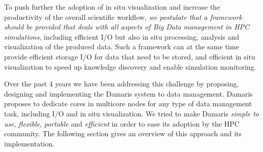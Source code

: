 		To push further the adoption of in situ visualization and increase the productivity of the overall
		scientific workflow, \emph{we postulate that a framework should be provided that deals with
		all aspects of Big Data management in HPC simulations}, including efficient I/O but also
		in situ processing, analysis and visualization of the produced data.
		Such a framework can at the same time provide efficient storage I/O for data that need to be stored,
		and efficient in situ visualization to speed up knowledge discovery and enable simulation monitoring.
		
		
			
			
		
		Over the past 4 years we have been addressing this challenge by proposing, designing and
		implementing the Damaris system to data management.
		Damaris proposes to dedicate cores
		in multicore nodes for any type of data management task, including I/O and in situ visualization.
		We tried to make Damaris \emph{simple to use}, \emph{flexible}, \emph{portable} and \emph{efficient} 
		in order to ease its adoption by the HPC community. 
		The following section gives an overview of this approach and its implementation.
		

